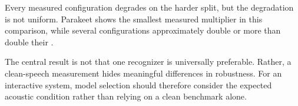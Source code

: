 Every measured configuration degrades on the harder split, but the degradation is not uniform.
Parakeet shows the smallest measured multiplier in this comparison, while several configurations
approximately double or more than double their \wer{}.

The central result is not that one recognizer is universally preferable. Rather, a clean-speech
measurement hides meaningful differences in robustness. For an interactive system, model
selection should therefore consider the expected acoustic condition rather than relying on a
clean benchmark alone.